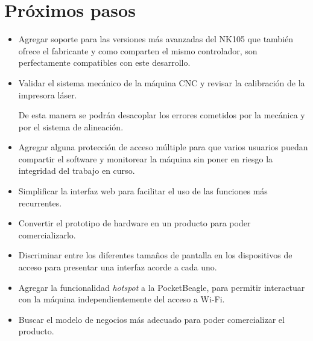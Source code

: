 \section{Próximos pasos}

\begin{itemize}
\item{Agregar soporte para las versiones más avanzadas del NK105 que también ofrece el fabricante y como comparten el mismo controlador, son perfectamente compatibles con este desarrollo.}
\item{Validar el sistema mecánico de la máquina CNC y revisar la calibración de la impresora láser.\par De esta manera se podrán desacoplar los errores cometidos por la mecánica y por el sistema de alineación.}

\item{Agregar alguna protección de acceso múltiple para que varios usuarios puedan compartir el software y monitorear la máquina sin poner en riesgo la integridad del trabajo en curso.}

\item{Simplificar la interfaz web para facilitar el uso de las funciones más recurrentes.}
\item{Convertir el prototipo de hardware en un producto para poder comercializarlo.}
\item{Discriminar entre los diferentes tamaños de pantalla en los dispositivos de acceso para presentar una interfaz acorde a cada uno.}
\item{Agregar la funcionalidad \textit{hotspot} a la PocketBeagle, para permitir interactuar con la máquina independientemente del acceso a Wi-Fi.}
\item{Buscar el modelo de negocios más adecuado para poder comercializar el producto.}
\end{itemize}
